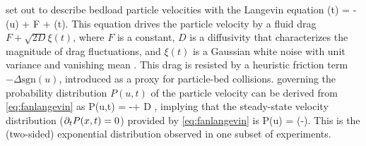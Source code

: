 \citet{Fan2014} set out to describe \DIFdelbegin {}\DIFdelend \DIFaddbegin {}\DIFaddend bedload particle velocities \DIFdelbegin {}\DIFdelend with the Langevin equation
\be {}(t) = -\Delta {}(u) + F + \xi(t). \label{eq:fanlangevin}\ee
This equation drives the particle velocity \DIFaddbegin {}\DIFaddend by a fluid drag $F + \sqrt{2D} \xi(t)$, where $F$ is a constant, $D$ is a diffusivity that characterizes the magnitude of drag fluctuations, and $\xi(t)$ is a Gaussian white noise with unit variance and vanishing mean \citep{Gardiner1983}.
This drag is resisted by a heuristic \DIFdelbegin {}\DIFdelend \DIFaddbegin {}\DIFaddend friction term $-\Delta \text{sgn}(u)$, introduced as a proxy for particle-bed collisions. \DIFdelbegin {}\DIFdelend \DIFaddbegin {}\DIFaddend governing the probability distribution $P(u,t)$ of the particle velocity \DIFaddbegin {}\DIFaddend can be derived from \DIFdelbegin {}\DIFdelend \DIFaddbegin {}\DIFaddend \ref{eq:fanlangevin} as \citep{Risken1989,VanKampen2007} 
\be {} P(u,t) = -\Delta{} + D ,\ee
implying that the steady-state velocity distribution ($\partial_t P(x,t) = 0$) provided by \DIFdelbegin {}\DIFdelend \DIFaddbegin {}\DIFaddend \ref{eq:fanlangevin} is
\be P(u) = \exp\Big(-\Big).\ee
This is the (two-sided) exponential distribution observed in one subset of experiments.

